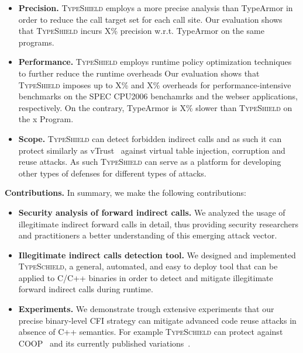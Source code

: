 \begin{itemize}
 \item \textbf{Precision.} \textsc{TypeShield} employs a more precise analysis than TypeArmor in order to reduce the call target set for each 
               call site. Our evaluation shows that \textsc{TypeShield} incurs X\% precision w.r.t. TypeArmor on the same programs.
 \item \textbf{Performance.} \textsc{TypeShield} employs runtime policy optimization techniques to further reduce the runtime overheads
              Our evaluation shows that \textsc{TypeShield} imposes up to X\% and X\% overheads for performance-intensive benchmarks on the
              SPEC CPU2006 benchamrks and the webser applications, respectively. On
              the contrary, TypeArmor is X\% slower than \textsc{TypeShield}
              on the x Program.
 \item \textbf{Scope.} \textsc{TypeShield} can detect forbidden indirect calls and as such it can protect similarly as vTrust~\cite{zhang:vtrust} against
              virtual table injection, corruption and reuse attacks. As such \textsc{TypeShield} can serve as a platform for developing other types of defenses for different 
              types of attacks.
\end{itemize}

\textbf{Contributions.} In summary, we make the following contributions:
\label{Contribution}
\begin{itemize}
 \item \textbf{Security analysis of forward indirect calls.} 
 We analyzed the usage of illegitimate indirect forward calls in detail,
 thus providing security researchers and
practitioners a better understanding of this emerging
attack vector.

 \item \textbf{Illegitimate indirect calls detection tool.}
 We designed and implemented \textsc{TypeSchield}, a general, automated, and easy to deploy tool
 that can be applied to C/C++ binaries in order to detect and mitigate illegitimate forward indirect calls 
 during runtime. 
 
 \item \textbf{Experiments.} We demonstrate trough extensive experiments that our precise
 binary-level CFI strategy can mitigate advanced code reuse attacks in absence of C++ semantics.
 For example \textsc{TypeSchield} can protect against COOP~\cite{schuster:coop} and its currently published 
 variations~\cite{ctf:coop, crane:readactor++, loop:oriented, subversive-c:lettner}.
\end{itemize}

